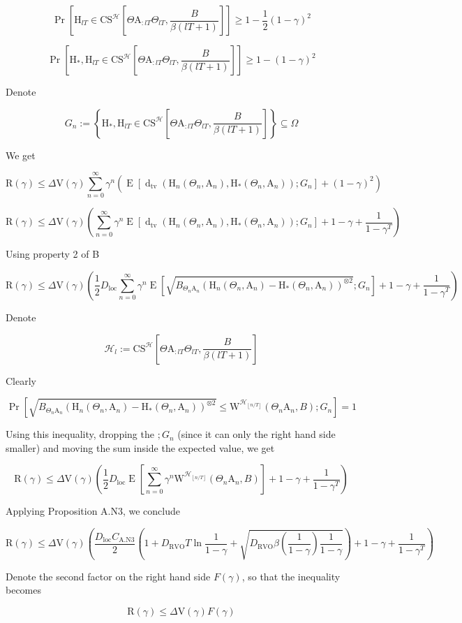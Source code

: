 \documentclass[a4paper]{article}
\newcommand{\AP}[1]{\left(#1\right)}
\newcommand{\AB}[1]{\left[#1\right]}
\newcommand{\AC}[1]{\left\{#1\right\}}
\newcommand{\Pa}[2]{\underset{#1}{\operatorname{Pr}}\AB{#2}}
\newcommand{\Ea}[2]{\underset{#1}{\operatorname{E}}\AB{#2}}
\newcommand{\Dtva}[1]{\operatorname{d}_{\text{tv}}\AP{#1}}
\newcommand{\Floor}[1]{\left\lfloor #1 \right\rfloor}
\newcommand{\B}{B}
\newcommand{\Hy}{\mathcal{H}}
\newcommand{\DRVO}{D_{\mathrm{RVO}}}
\newcommand{\DL}{D_{\mathrm{loc}}}
\newcommand{\V}{\mathrm{V}}
\newcommand{\Reg}{\mathrm{R}}
\newcommand{\CS}{\mathrm{CS}}
\newcommand{\W}{\mathrm{W}}
\newcommand{\AT}{\mathrm{A}}
\newcommand{\THy}{\mathrm{H}_*}
\newcommand{\SHy}{\mathrm{H}}
\newcommand{\De}{\Delta}
\newcommand{\CSE}{G}
\begin{document}
$$\Pa{}{\SHy_{lT}\in\CS^\Hy\AB{\Theta\AT_{:lT}\Theta_{lT},\frac{\B }{\beta(lT+1)}}} \geq 1-\frac{1}{2}(1-\gamma)^2$$

$$\Pa{}{\SHy_*,\SHy_{lT}\in\CS^\Hy\AB{\Theta\AT_{:lT}\Theta_{lT},\frac{\B }{\beta(lT+1)}}} \geq 1-(1-\gamma)^2$$

Denote

$$\CSE_n:=\AC{\SHy_*,\SHy_{lT}\in\CS^\Hy\AB{\Theta\AT_{:lT}\Theta_{lT},\frac{\B }{\beta(lT+1)}}}\subseteq\Omega$$

We get

$$\Reg(\gamma)\leq\Delta\V(\gamma)\sum_{n=0}^\infty\gamma^{n}\AP{\Ea{}{\Dtva{\SHy_n\AP{\Theta_n,\AT_n},\THy\AP{\Theta_n,\AT_n}};\CSE_n }+(1-\gamma)^2}$$

$$\Reg(\gamma)\leq\Delta\V(\gamma)\AP{\sum_{n=0}^\infty\gamma^{n}\Ea{}{\Dtva{\SHy_n\AP{\Theta_n,\AT_n},\THy\AP{\Theta_n,\AT_n}};\CSE_n }+1-\gamma+\frac{1}{1-\gamma^T}}$$

Using property 2 of B

$$\Reg(\gamma)\leq\Delta\V(\gamma)\AP{\frac{1}{2}\DL\sum_{n=0}^\infty\gamma^{n}\Ea{}{\sqrt{B_{\Theta_n\AT_n}\AP{\SHy_n\AP{\Theta_n,\AT_n}-\THy\AP{\Theta_n,\AT_n}}^{\otimes2}};\CSE_n }+1-\gamma+\frac{1}{1-\gamma^T}}$$

Denote

$$\Hy_l:=\CS^\Hy\AB{\Theta\AT_{:lT}\Theta_{lT},\frac{\B }{\beta(lT+1)}}$$

Clearly

$$\Pa{}{\sqrt{B_{\Theta_n\AT_n}\AP{\SHy_n\AP{\Theta_n,\AT_n}-\THy\AP{\Theta_n,\AT_n}}^{\otimes2}}\leq\W^{\Hy_{\Floor{n/T}}}\AP{\Theta_n\AT_n,B};\CSE_n}=1$$

Using this inequality, dropping the $;G_n$ (since it can only the right hand side smaller) and moving the sum inside the expected value, we get

$$\Reg(\gamma)\leq\Delta\V(\gamma)\AP{\frac{1}{2}\DL\Ea{}{\sum_{n=0}^\infty\gamma^{n}\W^{\Hy_{\Floor{n/T}}}\AP{\Theta_n\AT_n,B} }+1-\gamma+\frac{1}{1-\gamma^T}}$$

Applying Proposition A.N3, we conclude

$$\Reg(\gamma)\leq\Delta\V(\gamma)\AP{\frac{\DL C_{\mathrm{A.N3}}}{2}\AP{1+\DRVO T\ln\frac{1}{1-\gamma}+\sqrt{\DRVO\beta\AP{\frac{1}{1-\gamma}}\frac{1}{1-\gamma}}}+1-\gamma+\frac{1}{1-\gamma^T}}$$

Denote the second factor on the right hand side $F(\gamma)$, so that the inequality becomes 

$$\Reg(\gamma)\leq\De\V(\gamma)F(\gamma)$$
\end{document}
